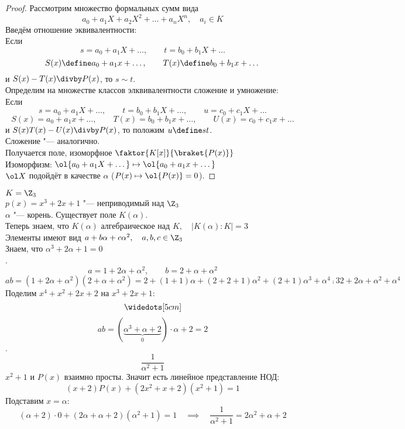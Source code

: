 \begin{proof}
	Рассмотрим множество формальных сумм вида
	$$ a_0 + a_1X + a_2X^2 + \dots + a_nX^n, \quad a_i \in K $$
	Введём отношение эквивалентности: \\
	Если
	$$ s = a_0 + a_1X + \dots, \qquad t = b_0 + b_1X + \dots $$
	$$ S(x) \define a_0 + a_1x + \dots, \qquad T(x) \define b_0 + b_1x + \dots $$
	и $ S(x) - T(x) \divby P(x) $, то $ s \sim t $. \\
	Определим на множестве классов элквивалентности сложение и умножение: \\
	Если
	$$ s = a_0 + a_1X + \dots, \qquad t = b_0 + b_1X + \dots, \qquad u = c_0 + c_1X + \dots $$
	$$ S(x) = a_0 + a_1x + \dots, \qquad T(x) = b_0 + b_1x + \dots, \qquad U(x) = c_0 + c_1x + \dots $$
	и $ S(x)T(x) - U(x) \divby P(x) $, то положим $ u \define st $. \\
	Сложение "--- аналогично. \\
	Получается поле, изоморфное $ \faktor{K[x]}{\braket{P(x)}} $ \\
	Изоморфизм: $ \ol{a_0 + a_1X + \dots} \mapsto \ol{a_0 + a_1x + \dots} $ \\
	$ \ol X $ подойдёт в качестве $ \alpha $ (\as $ P(x) \mapsto \ol{P(x)} = 0 $).
\end{proof}

\begin{eg}
	$ K = \Z_3 $ \\
	$ p(x) = x^3 + 2x + 1 $ "--- неприводимый над $ \Z_3 $ \\
	$ \alpha $ "--- корень. Существует поле $ K(\alpha) $. \\
	Теперь знаем, что $ K(\alpha) $ алгебраическое над $ K, \quad |K(\alpha) : K| = 3 $ \\
	Элементы имеют вид $ a + b\alpha + c\alpha^2, \quad a, b, c \in \Z_3 $ \\
	Знаем, что $ \alpha^3 + 2\alpha + 1 = 0 $ \\
	.
	$$ a = 1 + 2\alpha + \alpha^2, \qquad b = 2 + \alpha + \alpha^2 $$
	$$ ab = (1 + 2\alpha + \alpha^2)(2 + \alpha + \alpha^2) = 2 + (1 + 1) \alpha + (2 + 2 + 1)\alpha^2 + (2 + 1)\alpha^3 + \alpha^4 \comp3 2 + 2\alpha + \alpha^2 + \alpha^4 $$
	Поделим $ x^4 + x^2 + 2x + 2 $ на $ x^3 + 2x + 1 $:
	$$ \widedots[5cm] $$
	$$ ab = (\underbrace{\alpha^3 + \alpha + 2}_0) \cdot \alpha + 2 = 2 $$
	.
	$$ \frac1{\alpha^2 + 1} $$
	$ x^2 + 1 $ и $ P(x) $ взаимно просты. Значит есть линейное представление НОД:
	$$ (x + 2)P(x) + (2x^2 + x + 2)(x^2 + 1) = 1 $$
	Подставим $ x = \alpha $:
	$$ (\alpha + 2) \cdot 0 + (2\alpha + \alpha + 2)(\alpha^2 + 1) = 1 \quad \implies \quad \frac1{\alpha^2 + 1} = 2\alpha^2 + \alpha + 2 $$
\end{eg}

